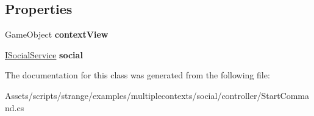 \subsection*{Properties}
\begin{DoxyCompactItemize}
\item 
\hypertarget{classstrange_1_1examples_1_1multiplecontexts_1_1social_1_1_start_command_a804d3620f1fbe42d06d923708f2ea289}{Game\-Object {\bfseries context\-View}}\label{classstrange_1_1examples_1_1multiplecontexts_1_1social_1_1_start_command_a804d3620f1fbe42d06d923708f2ea289}

\item 
\hypertarget{classstrange_1_1examples_1_1multiplecontexts_1_1social_1_1_start_command_a7d30aed71d4c3783ee3799c1197437d2}{\hyperlink{interfacestrange_1_1examples_1_1multiplecontexts_1_1social_1_1_i_social_service}{I\-Social\-Service} {\bfseries social}}\label{classstrange_1_1examples_1_1multiplecontexts_1_1social_1_1_start_command_a7d30aed71d4c3783ee3799c1197437d2}

\end{DoxyCompactItemize}


The documentation for this class was generated from the following file\-:\begin{DoxyCompactItemize}
\item 
Assets/scripts/strange/examples/multiplecontexts/social/controller/Start\-Command.\-cs\end{DoxyCompactItemize}
